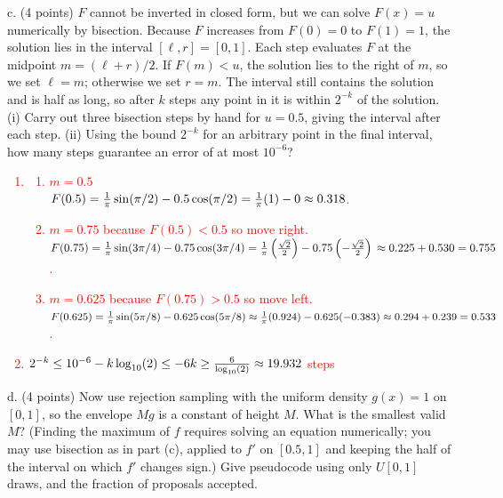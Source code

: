 \documentclass[11pt]{article}
\begin{document}
c. (4 points) $F$ cannot be inverted in closed form, but we can solve $F(x)=u$ numerically by bisection.  Because $F$ increases from $F(0)=0$ to $F(1)=1$, the solution lies in the interval $[\ell,r]=[0,1]$. Each step evaluates $F$ at the midpoint $m=(\ell+r)/2$.  If $F(m)<u$, the solution lies to the right of $m$, so we set $\ell=m$; otherwise we set $r=m$.  The interval still contains the solution and is half as long, so after $k$ steps any point in it is within $2^{-k}$ of the solution.  (i) Carry out three bisection steps by hand for $u=0.5$, giving the interval after each step. (ii) Using the bound $2^{-k}$ for an arbitrary point in the final interval, how many steps guarantee an error of at most $10^{-6}$?
\textcolor{red}{
\begin{enumerate}[label=(\roman*)]
    \item 
        \begin{enumerate}
            \item 
                $m = 0.5$\\
                $F(0.5) = \frac{1}{\pi}\sin(\pi/2) - 0.5\cos(\pi/2) = \frac{1}{\pi}(1) - 0 \\
                \approx 0.318$.
            \item 
                $m = 0.75$ because $F(0.5) < 0.5$ so move right.\\
                $F(0.75) = \frac{1}{\pi}\sin(3\pi/4) - 0.75\cos(3\pi/4) = \frac{1}{\pi}\left(\frac{\sqrt{2}}{2}\right) - 0.75\left(-\frac{\sqrt{2}}{2}\right) \\
                \approx 0.225 + 0.530 = 0.755$.
            \item 
                $m = 0.625$ because $F(0.75) > 0.5$ so move left.\\
                $F(0.625) = \frac{1}{\pi}\sin(5\pi/8) - 0.625\cos(5\pi/8) \approx \frac{1}{\pi}(0.924) - 0.625(-0.383) \\
                \approx 0.294 + 0.239 = 0.533$.
        \end{enumerate}
    \item 
        $2^{-k} \le 10^{-6}\\
        -k \log_{10}(2) \le -6\\
        k \ge \frac{6}{\log_{10}(2)} \approx 19.932$ steps
\end{enumerate}
}

d. (4 points) Now use rejection sampling with the uniform density $g(x)=1$ on $[0,1]$, so the envelope $Mg$ is a constant of height $M$.  What is the smallest valid $M$?  (Finding the maximum of $f$ requires solving an equation numerically; you may use bisection as in part (c), applied to $f'$ on $[0.5,1]$ and keeping the half of the interval on which $f'$ changes sign.)  Give pseudocode using only $U[0,1]$ draws, and the fraction of proposals accepted.
\end{document}
